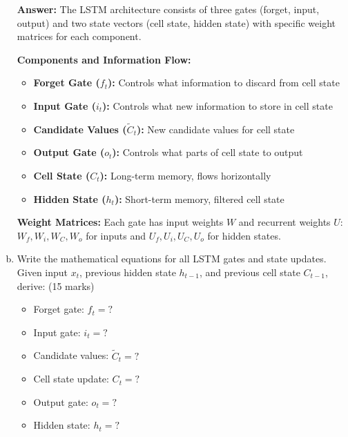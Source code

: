 \documentclass[12pt]{article}
\newcommand{\answer}[1]{{\color{answercolor}\textbf{Answer:} #1}}
\newcommand{\explanation}[1]{{\color{explanationcolor}#1}}
\begin{document}
\begin{enumerate}[(a)]
\begin{center}
    \end{center}
    
    \answer{The LSTM architecture consists of three gates (forget, input, output) and two state vectors (cell state, hidden state) with specific weight matrices for each component.}
    
    \explanation{
    \textbf{Components and Information Flow:}
    \begin{itemize}
        \item \textbf{Forget Gate ($f_t$):} Controls what information to discard from cell state
        \item \textbf{Input Gate ($i_t$):} Controls what new information to store in cell state
        \item \textbf{Candidate Values ($\tilde{C}_t$):} New candidate values for cell state
        \item \textbf{Output Gate ($o_t$):} Controls what parts of cell state to output
        \item \textbf{Cell State ($C_t$):} Long-term memory, flows horizontally
        \item \textbf{Hidden State ($h_t$):} Short-term memory, filtered cell state
    \end{itemize}
    
    \textbf{Weight Matrices:}
    Each gate has input weights $W$ and recurrent weights $U$:
    $W_f, W_i, W_C, W_o$ for inputs and $U_f, U_i, U_C, U_o$ for hidden states.
    }
    
    \item Write the mathematical equations for all LSTM gates and state updates. Given input $x_t$, previous hidden state $h_{t-1}$, and previous cell state $C_{t-1}$, derive: \hfill (15 marks)
    \begin{itemize}
        \item Forget gate: $f_t = ?$
        \item Input gate: $i_t = ?$
        \item Candidate values: $\tilde{C}_t = ?$
        \item Cell state update: $C_t = ?$
        \item Output gate: $o_t = ?$
        \item Hidden state: $h_t = ?$
    \end{itemize}
    

\end{enumerate}
\end{document}

